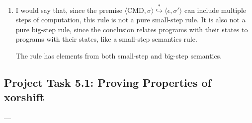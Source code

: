\documentclass[12pt,a4paper]{article}
\begin{document}
\begin{enumerate}
    \item I would say that, since the premise $\langle \mathrm{CMD},\sigma\rangle \overset{*}{\hookrightarrow} \langle\epsilon,\sigma'\rangle$ can include multiple steps of computation, this rule is not a pure small-step rule. It is also not a pure big-step rule, since the conclusion relates programs with their states to programs with their states, like a small-step semantics rule.

    The rule has elements from both small-step and big-step semantics.
\end{enumerate}


\subsection*{Project Task 5.1: Proving Properties of xorshift}
---
\end{document}
